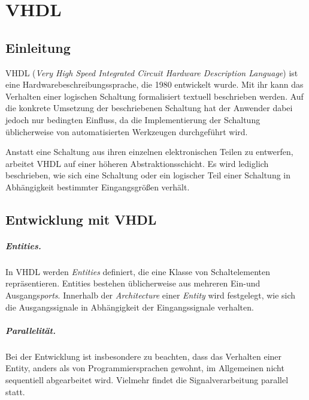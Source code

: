 \chapter{VHDL} %
\label{VHDL} %

\section{Einleitung}
VHDL (\textit{Very High Speed Integrated Circuit Hardware Description Language}) ist eine Hardwarebeschreibungssprache, die 1980 entwickelt wurde. Mit ihr kann das Verhalten einer logischen Schaltung formalisiert textuell beschrieben werden. Auf die konkrete Umsetzung der beschriebenen Schaltung hat der Anwender dabei jedoch nur bedingten Einfluss, da die Implementierung der Schaltung üblicherweise von automatisierten Werkzeugen durchgeführt wird. 

Anstatt eine Schaltung aus ihren einzelnen elektronischen Teilen zu entwerfen, arbeitet VHDL auf einer höheren Abstraktionsschicht. Es wird lediglich beschrieben, wie sich eine Schaltung oder ein logischer Teil einer Schaltung in Abhängigkeit bestimmter Eingangsgrößen verhält.

\section{Entwicklung mit VHDL}
\paragraph{Entities.} In VHDL werden \textit{Entities} definiert, die eine Klasse von Schaltelementen repräsentieren. Entities bestehen üblicherweise aus mehreren Ein-und Ausgangs\textit{ports}. Innerhalb der \textit{Architecture} einer \textit{Entity} wird festgelegt, wie sich die Ausgangssignale in Abhängigkeit der Eingangssignale verhalten.

\paragraph{Parallelität.} Bei der Entwicklung ist insbesondere zu beachten, dass das Verhalten einer Entity, anders als von Programmiersprachen gewohnt, im Allgemeinen nicht sequentiell abgearbeitet wird. Vielmehr findet die Signalverarbeitung parallel statt.

